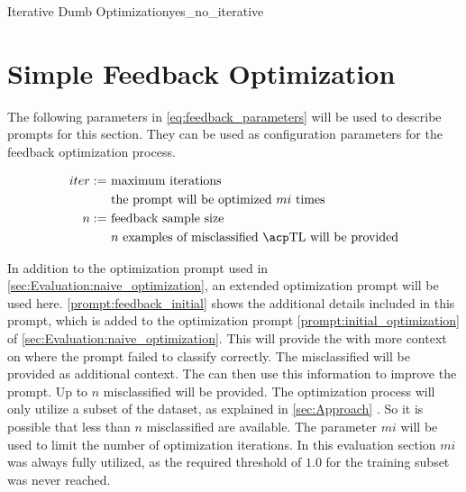 \begin{prompt}{\KISS Iterative Dumb Optimization}{yes_no_iterative}
\begin{table}
    \centering
    \renewcommand{\arraystretch}{1.4}
    
    \renewcommand{\arraystretch}{1}
    \caption{Naive prompt optimization approach prompting the model to optimize the classification prompt}
    \label{tab:naive_optimization}
\end{table}

\newpage


\section{Simple Feedback Optimization}
\label{sec:Evaluation:simple_feedback_optimization}

The following parameters in \autoref{eq:feedback_parameters} will be used to describe prompts for this section.
They can be used as configuration parameters for the feedback optimization process.

\begin{equation}
    \label{eq:feedback_parameters}
    \begin{aligned}
        iter := & \ \text{maximum iterations} \\
        & \ \text{the prompt will be optimized $mi$ times} \\
        n :=    & \ \text{feedback sample size} \\
        & \ \text{$n$ examples of misclassified \TLs will be provided}
    \end{aligned}
\end{equation}

In addition to the optimization prompt used in \autoref{sec:Evaluation:naive_optimization}, an extended optimization prompt will be used here.
\autoref{prompt:feedback_initial} shows the additional details included in this prompt, which is added to the optimization prompt \autoref{prompt:initial_optimization} of \autoref{sec:Evaluation:naive_optimization}.
This will provide the \LLM with more context on where the prompt failed to classify correctly.
The misclassified \TLs will be provided as additional context.
The \LLM can then use this information to improve the prompt.
Up to $n$ misclassified \TLs will be provided.
The optimization process will only utilize a subset of the dataset, as explained in \autoref{sec:Approach} .
So it is possible that less than $n$ misclassified \TLs are available.
The parameter $mi$ will be used to limit the number of optimization iterations.
In this evaluation section $mi$ was always fully utilized, as the required \fone threshold of $1.0$ for the training subset was never reached.


\end{prompt}
